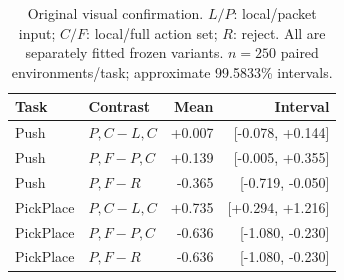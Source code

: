 \documentclass[10pt,a4paper]{article}
\begin{document}
\setcounter{table}{3}
\begin{table}[H]
\centering\small
\caption{Original visual confirmation. $L/P$: local/packet input; $C/F$: local/full action set; $R$: reject. All are separately fitted frozen variants. $n=250$ paired environments/task; approximate 99.5833\% intervals.}
\begin{tabular}{llrr}
\toprule Task & Contrast & Mean & Interval\\
\midrule
Push & $P,C-L,C$ & +0.007 & [-0.078, +0.144]\\
Push & $P,F-P,C$ & +0.139 & [-0.005, +0.355]\\
Push & $P,F-R$ & -0.365 & [-0.719, -0.050]\\
PickPlace & $P,C-L,C$ & +0.735 & [+0.294, +1.216]\\
PickPlace & $P,F-P,C$ & -0.636 & [-1.080, -0.230]\\
PickPlace & $P,F-R$ & -0.636 & [-1.080, -0.230]\\
\bottomrule
\end{tabular}
\end{table}
\end{document}
